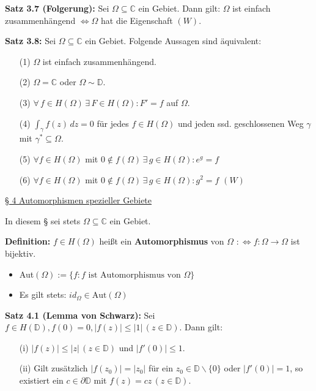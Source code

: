 \documentclass[11pt]{article}
\newcommand{\C}{\mathbb{C}}
\newcommand{\D}{\mathbb{D}}
\begin{document}
\textbf{Satz 3.7 (Folgerung):} Sei $\Omega \subseteq \C$ ein Gebiet. Dann gilt: $\Omega$ ist einfach zusammenhängend $\Leftrightarrow \Omega$ hat die Eigenschaft $(W)$.

\textbf{Satz 3.8:} Sei $\Omega \subseteq \C$ ein Gebiet. Folgende Aussagen sind äquivalent:
\vspace{-0.6cm}
\begin{itemize}
\item[(1)] $\Omega$ ist einfach zusammenhängend. \vspace{-0.2cm}
\item[(2)] $\Omega = \C$ oder $\Omega \sim \D$. \vspace{-0.2cm}
\item[(3)] $\forall \, f \in H(\Omega) \, \exists \, F \in H(\Omega) \colon F' = f$ auf $\Omega$. \vspace{-0.2cm}
\item[(4)] $\int_\gamma f(z) \, dz = 0$ für jedes $f \in H(\Omega)$ und jeden ssd. geschlossenen Weg $\gamma$ mit $\gamma^* \subseteq \Omega$. \vspace{-0.2cm}
\item[(5)] $\forall f \in H(\Omega)$ mit $0 \notin f(\Omega) \, \exists \, g \in H(\Omega)\colon e^g = f$ \vspace{-0.2cm}
\item[(6)] $\forall f \in H(\Omega)$ mit $0 \notin f(\Omega) \, \exists \, g \in H(\Omega)\colon g^2 = f$ $(W)$
\end{itemize} 
\vspace{-0.3cm}

\underline{§ 4 Automorphismen spezieller Gebiete}

In diesem § sei stets $\Omega \subseteq \C$ ein Gebiet.

\textbf{Definition:} $f \in H(\Omega)$ heißt ein \textbf{Automorphismus} von $\Omega$ $:\Leftrightarrow f\colon \Omega \to \Omega$ ist bijektiv. 
\vspace{-0.6cm}
\begin{itemize}
\item Aut$(\Omega) := \{f \colon f \text{ ist Automorphismus von } \Omega\}$ \vspace{-0.2cm}
\item Es gilt stets: $id_\Omega \in \text{Aut}(\Omega)$
\end{itemize}
\vspace{-0.3cm}

\textbf{Satz 4.1 (Lemma von Schwarz):} Sei $f \in H(\D), f(0) = 0, |f(z)| \leq |1| \, (z \in \D)$. Dann gilt: 
\vspace{-0.6cm}
\begin{itemize}
\item[(i)] $|f(z)| \leq |z| \, (z \in \D)$ und $|f'(0)| \leq 1$. \vspace{-0.2cm}
\item[(ii)] Gilt zusätzlich $|f(z_0)| = |z_0|$ für ein $z_0 \in \D \backslash \{0\}$ oder $|f'(0)| = 1$, so existiert ein $c \in \partial \D$ mit $f(z) = cz \, (z \in \D)$.
\end{itemize}
\vspace{-0.3cm}
\end{document}
